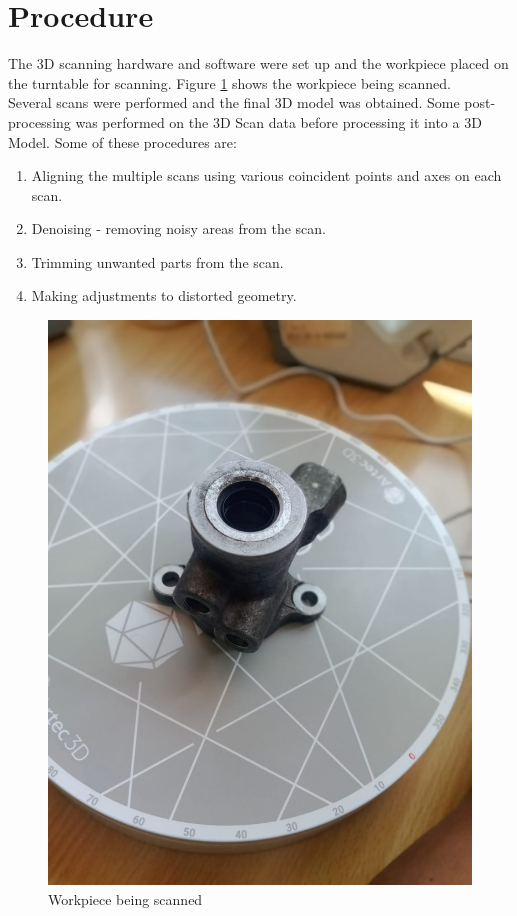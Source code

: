 \section{Procedure}
The 3D scanning hardware and software were set up and the workpiece placed on the turntable for scanning. Figure \ref{fig:scanning} shows the workpiece being scanned.\\
Several scans were performed and the final 3D model was obtained. Some post-processing was performed on the 3D Scan data before processing it into a 3D Model. Some of these procedures are:
\begin{enumerate}
	\item Aligning the multiple scans using various coincident points and axes on each scan.
	\item Denoising - removing noisy areas from the scan.
	\item Trimming unwanted parts from the scan.
	\item Making adjustments to distorted geometry.
\end{enumerate} 
\begin{center}
 	\begin{figure}[h!]
 	\centering
 	\includegraphics[width=0.4\linewidth]{Figures/Figure 2}
 	\caption[Scanning]{Workpiece being scanned}
 	\label{fig:scanning}
 	\end{figure}
 \end{center}

